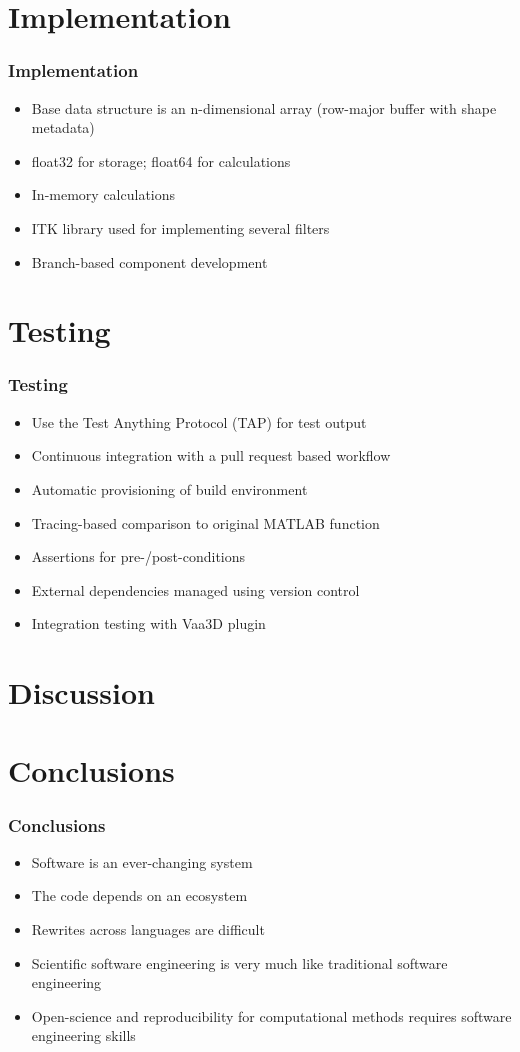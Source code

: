 \documentclass{beamer}
\begin{document}
\section{Implementation}

\begin{frame}
\frametitle{Implementation}
\begin{itemize}
	\item Base data structure is an n-dimensional array (row-major buffer with shape metadata)
	\item float32 for storage; float64 for calculations
	\item In-memory calculations
	\item ITK library used for implementing several filters
	\item Branch-based component development
\end{itemize}
\end{frame}

\section{Testing}

\begin{frame}
\frametitle{Testing}
\begin{itemize}
	\item Use the Test Anything Protocol (TAP) for test output
	\item Continuous integration with a pull request based workflow
	\item Automatic provisioning of build environment
	\item Tracing-based comparison to original MATLAB function
	\item Assertions for pre-/post-conditions
	\item External dependencies managed using version control
	\item Integration testing with Vaa3D plugin
\end{itemize}
\end{frame}

\section{Discussion}

\section{Conclusions}

\begin{frame}
\frametitle{Conclusions}
\begin{itemize}
	\item Software is an ever-changing system
	\item The code depends on an ecosystem
	\item Rewrites across languages are difficult
	\item Scientific software engineering is very much like traditional software engineering
	\item Open-science and reproducibility for computational methods requires software engineering skills
\end{itemize}
\end{frame}
\end{document}
